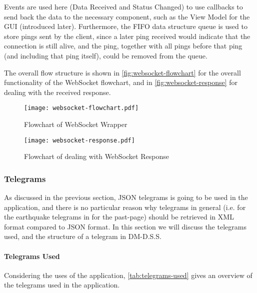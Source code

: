 Events are used here (Data Received and Status Changed) to use callbacks to send back the data to the necessary component, such as the View Model for the GUI (introduced later). Furthermore, the FIFO data structure queue is used to store pings sent by the client, since a later ping received would indicate that the connection is still alive, and the ping, together with all pings before that ping (and including that ping itself), could be removed from the queue.

The overall flow structure is shown in \autoref{fig:websocket-flowchart} for the overall functionality of the WebSocket flowchart, and in \autoref{fig:websocket-response} for dealing with the received response.

\begin{figure}
    \centering
    \texttt{[image: websocket-flowchart.pdf]}
    \caption{Flowchart of WebSocket Wrapper}
    \label{fig:websocket-flowchart}
\end{figure}

\begin{figure}
    \centering
    \texttt{[image: websocket-response.pdf]}
    \caption{Flowchart of dealing with WebSocket Response}
    \label{fig:websocket-response}
\end{figure}

\subsubsection{Telegrams}

As discussed in the previous section, JSON telegrams is going to be used in the application, and there is no particular reason why telegrams in general (i.e. for the earthquake telegrams in  for the past-page) should be retrieved in XML format compared to JSON format. In this section we will discuss the telegrams used, and the structure of a telegram in DM-D.S.S.

\paragraph{Telegrams Used}

Considering the uses of the application, \autoref{tab:telegrams-used} gives an overview of the telegrams used in the application.

